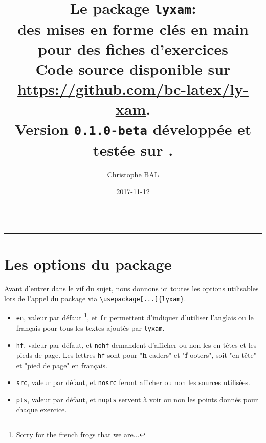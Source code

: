 \documentclass[12pt,a4paper]{scrartcl}
\theoremstyle{definition}
\begin{document}
\title{%
	Le package \texttt{lyxam}:\\%
	des mises en forme clés en main\\%
	pour des fiches d'exercices\\%
	{\footnotesize Code source disponible sur \url{https://github.com/bc-latex/ly-xam}.}\\%
	{\footnotesize Version \texttt{0.1.0-beta} développée et testée sur \macosxname{}.}%
}
\author{Christophe BAL}
\date{2017-11-12}

\maketitle


\vspace{2em}

\hrule

\tableofcontents

\vspace{1.5em}

\hrule

\newpage



\section{Les options du package}

Avant d'entrer dans le vif du sujet, nous donnons ici toutes les options utilisables lors de l'appel du package via \verb+\usepackage[...]{lyxam}+.

\begin{itemize}[label=\textbullet]

	\item \verb+en+, valeur par défaut
	\footnote{
		Sorry for the french frogs that we are...
	}, et \verb+fr+ permettent d'indiquer d'utiliser l'anglais ou le français pour tous les textes ajoutés par \verb+lyxam+.

	\item \verb+hf+, valeur par défaut, et \verb+nohf+ demandent d'afficher ou non les en-têtes et les pieds de page.
	Les lettres \verb+hf+ sont pour "\textbf{h}-eaders" et "\textbf{f}-ooters", soit "en-tête" et "pied de page" en français.

	\item \verb+src+, valeur par défaut, et \verb+nosrc+ feront afficher ou non les sources utilisées.

	\item \verb+pts+, valeur par défaut, et \verb+nopts+ servent à voir ou non les points donnés pour chaque exercice.
\end{itemize}
\end{document}
